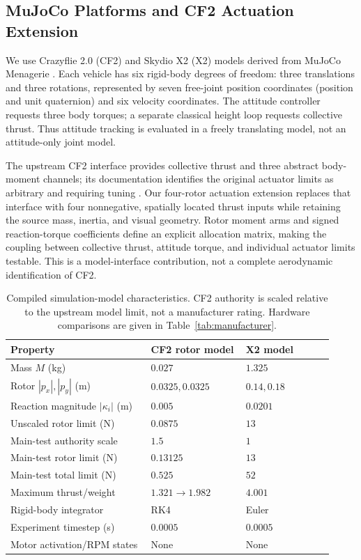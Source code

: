 \documentclass[letterpaper,10pt,conference]{IEEEtran}
\begin{document}
\subsection{MuJoCo Platforms and CF2 Actuation Extension}
We use Crazyflie 2.0 (CF2) and Skydio X2 (X2) models derived from MuJoCo
Menagerie \cite{menagerieModels}. Each vehicle has six rigid-body degrees of freedom: three
translations and three rotations, represented by seven free-joint position
coordinates (position and unit quaternion) and six velocity coordinates.
The attitude controller requests three body torques; a separate classical
height loop requests collective thrust. Thus attitude tracking is evaluated
in a freely translating model, not an attitude-only joint model.

The upstream CF2 interface provides collective thrust and three abstract
body-moment channels; its documentation identifies the original actuator
limits as arbitrary and requiring tuning \cite{menagerieCF2}. Our four-rotor actuation extension replaces that
interface with four nonnegative, spatially located thrust inputs while
retaining the source mass, inertia, and visual geometry. Rotor moment arms
and signed reaction-torque coefficients define an explicit allocation
matrix, making the coupling between collective thrust, attitude torque,
and individual actuator limits testable. This is a model-interface
contribution, not a complete aerodynamic identification of CF2.

\begin{table}[!ht]
\centering
\caption{Compiled simulation-model characteristics. CF2 authority is
scaled relative to the upstream model limit, not a manufacturer rating.
Hardware comparisons are given in Table~\ref{tab:manufacturer}.}
\label{tab:models}
\setlength{\tabcolsep}{3pt}
\footnotesize
\begin{tabular}{@{}p{0.40\linewidth}p{0.27\linewidth}p{0.25\linewidth}@{}}
\toprule
Property & CF2 rotor model & X2 model\\
\midrule
Mass $M$ (kg) & $0.027$ & $1.325$\\
Rotor $|p_x|,|p_y|$ (m) & $0.0325,0.0325$ & $0.14,0.18$\\
Reaction magnitude $|\kappa_i|$ (m) & $0.005$ & $0.0201$\\
Unscaled rotor limit (N) & $0.0875$ & $13$\\
Main-test authority scale & $1.5$ & $1$\\
Main-test rotor limit (N) & $0.13125$ & $13$\\
Main-test total limit (N) & $0.525$ & $52$\\
Maximum thrust/weight & $1.321\to1.982$ & $4.001$\\
Rigid-body integrator & RK4 & Euler\\
Experiment timestep (s) & $0.0005$ & $0.0005$\\
Motor activation/RPM states & None & None\\
\bottomrule
\end{tabular}
\end{table}
\end{document}
